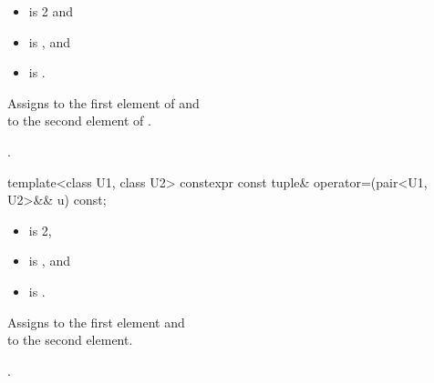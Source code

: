 \documentclass{wg21}
\begin{document}
\begin{itemdescr}
    \pnum
    \constraints
    \begin{itemize}
        \item {} is 2 and
        \item {} is , and
        \item {} is .
    \end{itemize}
    
    \pnum
    \effects
    Assigns  to the first
    element of  and\\  to the
    second element of .
    
    \pnum
    \returns
    .
\end{itemdescr}

%
\begin{itemdecl}
    template<class U1, class U2> constexpr const tuple& operator=(pair<U1, U2>&& u) const;
\end{itemdecl}

\begin{itemdescr}
    \pnum
    \constraints
    \begin{itemize}
        \item
         is 2,
        \item
         is , and
        \item
         is .
    \end{itemize}
    
    \pnum
    \effects
    Assigns  to the first element and\\
     to the second element.
    
    \pnum
    \returns
    .
\end{itemdescr}
\end{document}
